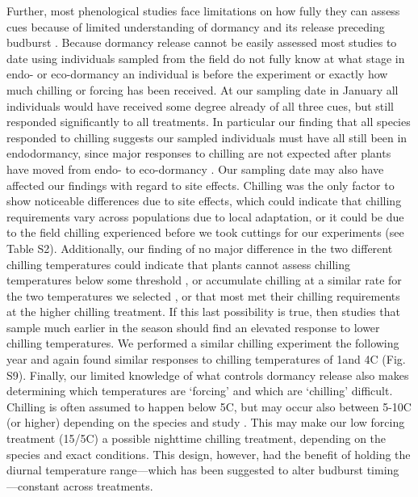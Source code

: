 \documentclass[11pt]{article}
\begin{document}
Further, most phenological studies face limitations on how fully they can assess cues because of limited understanding of dormancy and its release preceding budburst \citep{Cooke2012,chuine2016}. Because dormancy release cannot be easily assessed \citep{chuine2016} most studies to date using individuals sampled from the field do not fully know at what stage in endo- or eco-dormancy an individual is before the experiment or exactly how much chilling or forcing has been received. At our sampling date in January all individuals would have received some degree already of all three cues, but still responded significantly to all treatments. In particular our finding that all species responded to chilling suggests our sampled individuals must have all still been in endodormancy, since major responses to chilling are not expected after plants have moved from endo- to eco-dormancy \citep{chuine2016}. Our sampling date may also have affected our findings with regard to site effects. Chilling was the only factor to show noticeable differences due to site effects, which could indicate that chilling requirements vary across populations due to local adaptation, or it could be due to the field chilling experienced before we took cuttings for our experiments (see Table S2). Additionally, our finding of no major difference in the two different chilling temperatures could indicate that plants cannot assess chilling temperatures below some threshold \citep{coville1920,Harrington:2010,guy2014}, or accumulate chilling at a similar rate for the two temperatures we selected \citep[e.g.,][]{harrington2015}, or that most met their chilling requirements at the higher chilling treatment. If this last possibility is true, then studies that sample much earlier in the season should find an elevated response to lower chilling temperatures. We performed a similar chilling experiment the following year and again found similar responses to chilling temperatures of 1\degree  and 4\degree C (Fig. S9). Finally, our limited knowledge of what controls dormancy release also makes determining which temperatures are `forcing' and which are `chilling' difficult. Chilling is often assumed to happen below 5\degree C, but may occur also between 5-10\degree C (or higher) depending on the species and study \citep{Luedeling2013AgFM,harrington2015}. This may make our low forcing treatment (15/5\degree C) a possible nighttime chilling treatment, depending on the species and exact conditions. This design, however, had the benefit of holding the diurnal temperature range---which has been suggested to alter budburst timing \citep{rossi2017}---constant across treatments. \\ 
\end{document}
